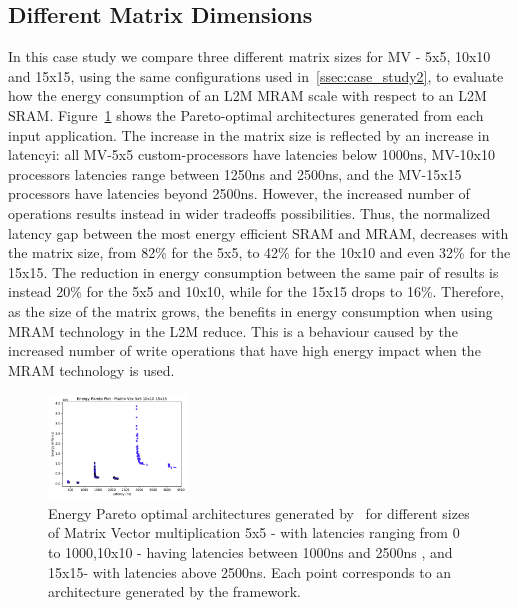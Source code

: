 \subsection{Different Matrix Dimensions}
\label{ssec:case_study3}
In this case study we compare three different matrix sizes for MV - 5x5, 10x10 and 15x15, using the same configurations used in~\ref{ssec:case_study2}, to evaluate how the energy consumption of an L2M MRAM scale with respect to an L2M SRAM. Figure~\ref{fig:sram_vs_mram_pareto_vec_sizes} shows the Pareto-optimal architectures generated from each input application. The increase in the matrix size is reflected by an increase in latencyi: all MV-5x5 custom-processors have latencies below 1000ns, MV-10x10 processors latencies range between 1250ns and 2500ns, and the MV-15x15 processors have latencies beyond 2500ns.
However, the increased number of operations results instead in wider tradeoffs possibilities. Thus, the normalized latency gap between the most energy efficient SRAM and MRAM, decreases with the matrix size, from 82\% for the 5x5, to 42\% for the 10x10 and even 32\% for the 15x15. The reduction in energy consumption between the same pair of results is instead 20\% for the 5x5 and 10x10, while for the 15x15 drops to 16\%. Therefore, as the size of the matrix grows, the benefits in energy consumption when using MRAM technology in the L2M reduce. This is a behaviour caused by the increased number of write operations that have high energy impact when the MRAM technology is used.



\begin{figure}[!h]
\centering
\includegraphics[width=0.33\textwidth]{graphs/EnergyParetoPlotMultipleSizeMAtrixVec.pdf}
    \caption{\small Energy Pareto optimal architectures generated by \frameworkname ~for different sizes of Matrix Vector multiplication 5x5 - with latencies ranging from 0 to 1000,10x10 - having latencies between 1000ns and 2500ns , and 15x15- with latencies above 2500ns. Each point corresponds to an architecture generated by the framework.}
\label{fig:sram_vs_mram_pareto_vec_sizes}
\end{figure}
